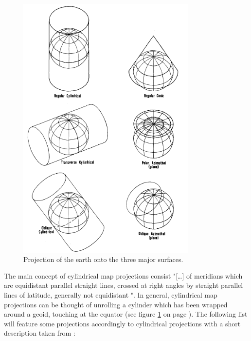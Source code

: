 \begin{figure}[!htb]
\centering
\includegraphics[width=0.8\textwidth,keepaspectratio]{images/methods/mappings.png}
\caption[
    Projection of the earth onto the three major surfaces .
]{Projection of the earth onto the three major surfaces.}
\label{fig:projections-base}
\end{figure}

The main concept of cylindrical map projections consist "[\ldots] of meridians which are equidistant parallel straight lines, crossed at right angles by straight parallel lines of latitude, generally not equidistant ".
In general, cylindrical map projections can be thought of unrolling a cylinder which has been wrapped around a geoid, touching at the equator (see figure \ref{fig:projections-base} on page \pageref{fig:projections-base}). The following list will feature some projections accordingly to cylindrical projections with a short description taken from \citeauthor{Snyder1987} :

